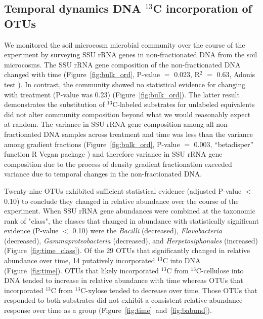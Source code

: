 \subsection{Temporal dynamics DNA $^{13}$C incorporation of OTUs}
We monitored the soil microcosm microbial community over the course of the
experiment by surveying SSU rRNA genes in non-fractionated DNA from the soil
microcosms. The SSU rRNA gene composition of the non-fractionated DNA changed
with time (Figure~\ref{fig:bulk_ord}, P-value $=$ 0.023, R$^{2}$ $=$ 0.63,
Adonis test \citep{Anderson2001a}). In contrast, the community showed no
statistical evidence for changing with treatment (P-value was 0.23)
(Figure~\ref{fig:bulk_ord}). The latter result demonstrates the substitution of
$^{13}$C-labeled substrates for unlabeled equivalents did not alter community
composition beyond what we would reasonably expect at random. The variance in
SSU rRNA gene composition among all non-fractionated DNA samples across
treatment and time was less than the variance among gradient fractions
(Figure~\ref{fig:bulk_ord}, P-value $=$ 0.003, “betadisper” function R Vegan
package \citep{oksanen2007vegan}) and therefore variance in SSU rRNA gene
composition due to the process of density gradient fractionation exceeded
variance due to temporal changes in the non-fractionated DNA.

Twenty-nine OTUs exhibited sufficient statistical evidence (adjusted P-value
$<$ 0.10) to conclude they changed in relative abundance over the
course of the experiment. When SSU rRNA gene abundances were combined at
the taxonomic rank of "class", the classes that changed in abundance with
statistically significant evidence (P-value $<$ 0.10) were the
\textit{Bacilli} (decreased), \textit{Flavobacteria} (decreased),
\textit{Gammaproteobacteria} (decreased), and \textit{Herpetosiphonales}
(increased) (Figure~\ref{fig:time_class}). Of the 29 OTUs that
significantly changed in relative abundance over time, 14 putatively
incorporated $^{13}$C into DNA (Figure~\ref{fig:time}). OTUs that likely
incorporated $^{13}$C from $^{13}$C-cellulose into DNA tended to increase
in relative abundance with time whereas OTUs that incorporated $^{13}$C
from $^{13}$C-xylose tended to decrease over time. Those OTUs that
responded to both substrates did not exhibit a consistent relative
abundance response over time as a group
(Figure~\ref{fig:time}~and~\ref{fig:babund}).

